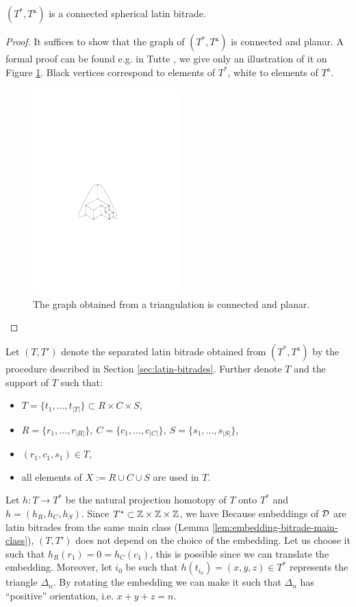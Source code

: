 \begin{lem}
$(T^*, T^\vartriangle)$ is a connected spherical latin bitrade.
\end{lem}
\begin{proof}
It suffices to show that the graph of $(T^*, T^\vartriangle)$ is connected and planar. A formal proof can be found e.g. in Tutte \cite{Tutte48}, we give only an illustration of it on Figure \ref{fig:triangulation-graph}. Black vertices correspond to elements of $T^*$, white to elements of $T^\vartriangle$.

\begin{figure}[htb]
\centering
\includegraphics[width=0.5\textwidth]{img/triangulation_graph.pdf}
\caption{The graph obtained from a triangulation is connected and planar.}
\label{fig:triangulation-graph}
\end{figure}
\end{proof}

Let $(T,T')$ denote the separated latin bitrade obtained from $(T^*, T^\vartriangle)$ by the procedure described in Section \ref{sec:latin-bitrades}. Further denote $T$ and the support of $T$ such that:
\begin{itemize}
	\item $T = \{t_1, \dots, t_{|T|}\} \subset R \times C \times S$,
	\item $R = \{r_1,\dots,r_{|R|}\},\ 
		C = \{c_1,\dots,c_{|C|}\},\ 
		S = \{s_1,\dots,s_{|S|}\}$,
	\item $(r_1,c_1,s_1) \in T$,
	\item all elements of $X := R \cup C \cup S$ are used in $T$.
\end{itemize}%
Let $h:T \rightarrow T^*$ be the natural projection homotopy of $T$ onto $T^*$ and $h = (h_R, h_C, h_S)$. Since $T^* \subset \mathbb Z \times \mathbb Z \times \mathbb Z$, we have
\cosyalign{
	h_R: R \rightarrow \Z,\ h_C: C \rightarrow \Z,\ h_S: S \rightarrow \Z.
}%
Because embeddings of $\mathcal D$ are latin bitrades from the same main class (Lemma \ref{lem:embedding-bitrade-main-class}), $(T,T')$ does not depend on the choice of the embedding. Let us choose it such that $h_R(r_1) = 0 = h_C(c_1)$, this is possible since we can translate the embedding. Moreover, let $i_0$ be such that $h(t_{i_0}) = (x,y,z) \in T^*$ represents the triangle $\Delta_n$. By rotating the embedding we can make it such that $\Delta_n$ has ``positive'' orientation, i.e. $x+y+z = n$.

